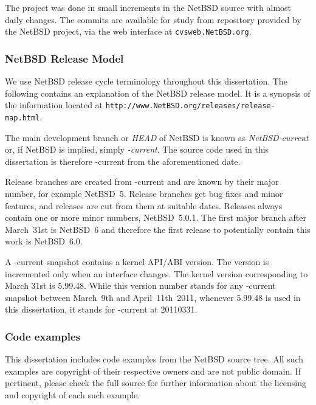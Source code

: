 The project was done in small increments in the NetBSD source with
almost daily changes.  The commits are available for study from
repository provided by the NetBSD project, \eg via the web interface
at \texttt{cvsweb.NetBSD.org}.

\subsubsection*{NetBSD Release Model}

We use NetBSD release cycle terminology throughout this dissertation.
The following contains an explanation of the NetBSD release model.
It is a synopsis of the information located at
\texttt{http://www.NetBSD.org/releases/release-map.html}.

The main development branch or \textit{HEAD} of NetBSD is known as
\textit{NetBSD-current} or, if NetBSD is implied, simply
\textit{-current}.  The source code used in this dissertation is
therefore -current from the aforementioned date.

Release branches are created from -current and are known by their
major number, for example NetBSD~5.  Release branches get bug fixes
and minor features, and releases are cut from them at suitable
dates.  Releases always contain one or more minor numbers, \eg
NetBSD~5.0.1.  The first major branch after March~31st is NetBSD~6
and therefore the first release to potentially contain this work
is NetBSD~6.0.

A -current snapshot contains a kernel API/ABI version.  The version is
incremented only when an interface changes.  The kernel version
corresponding to March 31st is 5.99.48.  While this version number
stands for any -current snapshot between March~9th and April~11th~2011,
whenever 5.99.48 is used in this dissertation, it stands for -current
at 20110331.

\subsubsection*{Code examples}

This dissertation includes code examples from the NetBSD source
tree.  All such examples are copyright of their respective owners
and are not public domain.  If pertinent, please check the full
source for further information about the licensing and copyright
of each such example.
